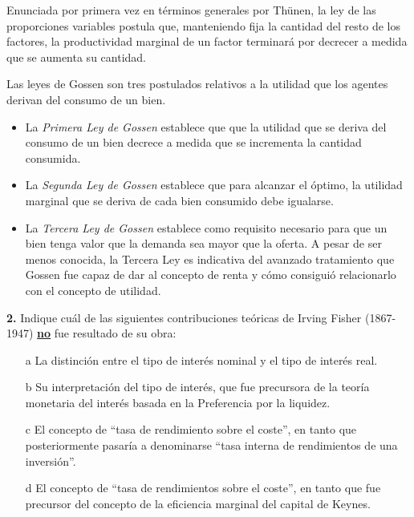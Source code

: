 \documentclass{nuevotema}
\begin{document}

Enunciada por primera vez en términos generales por Thünen, la ley de las proporciones variables postula que, manteniendo fija la cantidad del resto de los factores, la productividad marginal de un factor terminará por decrecer a medida que se aumenta su cantidad.


Las leyes de Gossen son tres postulados relativos a la utilidad que los agentes derivan del consumo de un bien. 
\begin{itemize} 
\item La \textit{Primera Ley de Gossen} establece que que la utilidad que se deriva del consumo de un bien decrece a medida que se incrementa la cantidad consumida. 
\item La \textit{Segunda Ley de Gossen} establece que para alcanzar el óptimo, la utilidad marginal que se deriva de cada bien consumido debe igualarse. 
\item La \textit{Tercera Ley de Gossen} establece como requisito necesario para que un bien tenga valor que la demanda sea mayor que la oferta. A pesar de ser menos conocida, la Tercera Ley es indicativa del avanzado tratamiento que Gossen fue capaz de dar al concepto de renta y cómo consiguió relacionarlo con el concepto de utilidad.
\end{itemize}

\preguntas



\textbf{2.} Indique cuál de las siguientes contribuciones teóricas de Irving Fisher (1867-1947) \underline{\textbf{no}} fue resultado de su obra:

\begin{itemize}
	\item[a] La distinción entre el tipo de interés nominal y el tipo de interés real.
	\item[b] Su interpretación del tipo de interés, que fue precursora de la teoría monetaria del interés basada en la Preferencia por la liquidez.
	\item[c] El concepto de ``tasa de rendimiento sobre el coste'', en tanto que posteriormente pasaría a denominarse ``tasa interna de rendimientos de una inversión''.
	\item[d] El concepto de ``tasa de rendimientos sobre el coste'', en tanto que fue precursor del concepto de la eficiencia marginal del capital de Keynes.
\end{itemize}
\end{document}
